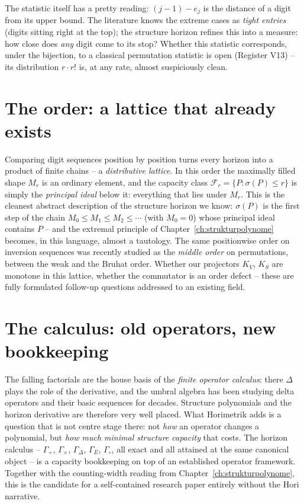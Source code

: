 The statistic itself has a pretty reading: $(j{-}1)-e_j$ is the
distance of a digit from its upper bound. The literature knows the
extreme cases as \emph{tight entries} (digits sitting right at the
top); the structure horizon refines this into a measure: how close
does \emph{any} digit come to its stop? Whether this statistic
corresponds, under the bijection, to a classical permutation
statistic is open (Register V13) -- its distribution $r\cdot r!$
is, at any rate, almost suspiciously clean.

\section{The order: a lattice that already exists}

Comparing digit sequences position by position turns every horizon
into a product of finite chains -- a \emph{distributive lattice}.
In this order the maximally filled shape $M_r$ is an ordinary
element, and the capacity class
$\mathcal F_r=\{P:\sigma(P)\le r\}$ is simply the
\emph{principal ideal} below it: everything that lies under $M_r$.
This is the cleanest abstract description of the structure horizon
we know: $\sigma(P)$ is the first step of the chain
$M_0\le M_1\le M_2\le\cdots$ (with $M_0=0$) whose principal ideal
contains $P$ -- and the extremal principle of
Chapter~\ref{ch:strukturpolynome} becomes, in this language,
almost a tautology. The same positionwise order on inversion
sequences was recently studied as the \emph{middle order} on
permutations, between the weak and the Bruhat order. Whether our
projectors $K_V$, $K_S$ are monotone in this lattice, whether the
commutator is an order defect -- these are fully formulated
follow-up questions addressed to an existing field.

\section{The calculus: old operators, new bookkeeping}

The falling factorials are the house basis of the \emph{finite
operator calculus}: there $\Delta$ plays the role of the
derivative, and the umbral algebra has been studying delta
operators and their basic sequences for decades. Structure
polynomials and the horizon derivative are therefore very well
placed. What Horimetrik adds is a question that is not centre
stage there: not \emph{how} an operator changes a polynomial, but
\emph{how much minimal structure capacity} that costs. The horizon
calculus -- $\Gamma_+$, $\Gamma_\times$, $\Gamma_\Delta$,
$\Gamma_E$, $\Gamma_\circ$, all exact and all attained at the same
canonical object -- is a capacity bookkeeping on top of an
established operator framework. Together with the counting-width
reading from Chapter~\ref{ch:strukturpolynome}, this is the
candidate for a self-contained research paper entirely without the
Hori narrative.

